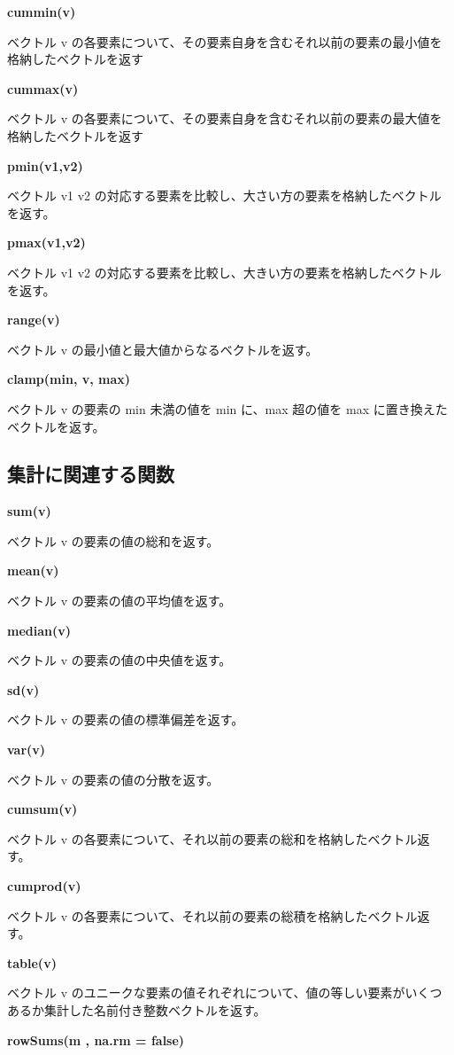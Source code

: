 \documentclass[]{book}
\begin{document}
\textbf{cummin(v)}

ベクトル v の各要素について、その要素自身を含むそれ以前の要素の最小値を格納したベクトルを返す

\textbf{cummax(v)}

ベクトル v の各要素について、その要素自身を含むそれ以前の要素の最大値を格納したベクトルを返す

\textbf{pmin(v1,v2)}

ベクトル v1 v2 の対応する要素を比較し、大さい方の要素を格納したベクトルを返す。

\textbf{pmax(v1,v2)}

ベクトル v1 v2 の対応する要素を比較し、大きい方の要素を格納したベクトルを返す。

\textbf{range(v)}

ベクトル v の最小値と最大値からなるベクトルを返す。

\textbf{clamp(min, v, max)}

ベクトル v の要素の min 未満の値を min に、max 超の値を max に置き換えたベクトルを返す。

\subsection{集計に関連する関数}

\textbf{sum(v)}

ベクトル v の要素の値の総和を返す。

\textbf{mean(v)}

ベクトル v の要素の値の平均値を返す。

\textbf{median(v)}

ベクトル v の要素の値の中央値を返す。

\textbf{sd(v)}

ベクトル v の要素の値の標準偏差を返す。

\textbf{var(v)}

ベクトル v の要素の値の分散を返す。

\textbf{cumsum(v)}

ベクトル v の各要素について、それ以前の要素の総和を格納したベクトル返す。

\textbf{cumprod(v)}

ベクトル v の各要素について、それ以前の要素の総積を格納したベクトル返す。

\textbf{table(v)}

ベクトル v のユニークな要素の値それぞれについて、値の等しい要素がいくつあるか集計した名前付き整数ベクトルを返す。

\textbf{rowSums(m , na.rm = false)}
\end{document}
